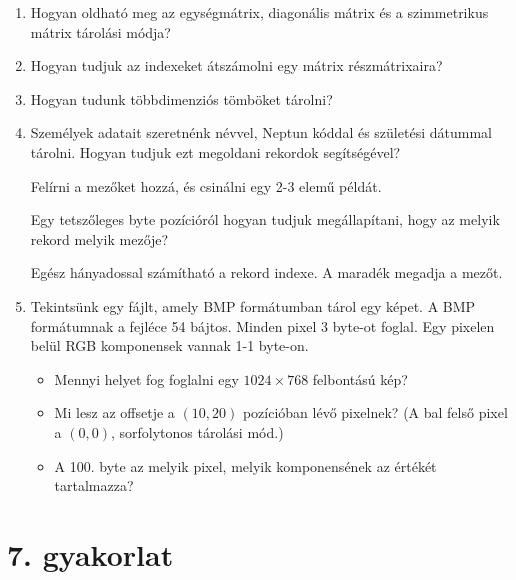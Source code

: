 \documentclass[a4paper]{article}
\newenvironment{solution}
{\color{RoyalBlue}}{\bigskip}
\begin{document}
\begin{enumerate}
\item

Hogyan oldható meg az egységmátrix, diagonális mátrix és a szimmetrikus mátrix tárolási módja?

\item

Hogyan tudjuk az indexeket átszámolni egy mátrix részmátrixaira?

\item

Hogyan tudunk többdimenziós tömböket tárolni?

\item

Személyek adatait szeretnénk névvel, Neptun kóddal és születési dátummal tárolni. Hogyan tudjuk ezt megoldani rekordok segítségével?

\begin{solution}
Felírni a mezőket hozzá, és csinálni egy 2-3 elemű példát.
\end{solution}

Egy tetszőleges byte pozícióról hogyan tudjuk megállapítani, hogy az melyik rekord melyik mezője?

\begin{solution}
Egész hányadossal számítható a rekord indexe. A maradék megadja a mezőt.
\end{solution}

\item

Tekintsünk egy fájlt, amely BMP formátumban tárol egy képet. A BMP formátumnak a fejléce 54 bájtos. Minden pixel 3 byte-ot foglal. Egy pixelen belül RGB komponensek vannak 1-1 byte-on.

\begin{itemize}
\item Mennyi helyet fog foglalni egy $1024 \times 768$ felbontású kép?
\item Mi lesz az offsetje a $(10, 20)$ pozícióban lévő pixelnek? (A bal felső pixel a $(0, 0)$, sorfolytonos tárolási mód.)
\item A 100. byte az melyik pixel, melyik komponensének az értékét tartalmazza?
\end{itemize}

\end{enumerate}

\section*{7. gyakorlat}
\end{document}
